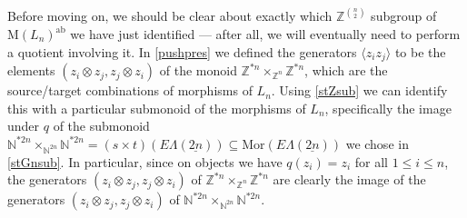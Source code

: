 \documentclass{amsbook} %
\newcommand{\ELnn}{E\Lambda(\underline{2n})}
\numberwithin{section}{chapter}
\begin{document}
Before moving on, we should be clear about exactly which $\mathbb{Z}^{{n}\choose{2}}$ subgroup of $\mathrm{M}(L_n)^{\mathrm{ab}}$ we have just identified --- after all, we will eventually need to perform a quotient involving it. In \cref{pushpres} we defined the generators $\langle z_i z_j \rangle$ to be the elements $(z_i \otimes z_j, z_j \otimes z_i)$ of the monoid $\mathbb{Z}^{\ast n} \times_{\mathbb{Z}^n} \mathbb{Z}^{\ast n}$, which are the source/target combinations of morphisms of $L_n$. Using \cref{stZsub} we can identify this with a particular submonoid of the morphisms of $L_n$, specifically the image under $q$ of the submonoid $\mathbb{N}^{\ast 2n} \times_{\mathbb{N}^{2n}} \mathbb{N}^{\ast 2n} = (s \times t)(\ELnn) \subseteq \mathrm{Mor}(\ELnn)$ we chose in \cref{stGnsub}. In particular, since on objects we have $q(z_i) = z_i$ for all $1 \le i \le n$, the generators $(z_i \otimes z_j, z_j \otimes z_i)$ of $\mathbb{Z}^{\ast n} \times_{\mathbb{Z}^n} \mathbb{Z}^{\ast n}$ are clearly the image of the generators $(z_i \otimes z_j, z_j \otimes z_i)$ of $\mathbb{N}^{\ast 2n} \times_{\mathbb{N}^{2n}} \mathbb{N}^{\ast 2n}$. 
\end{document}
